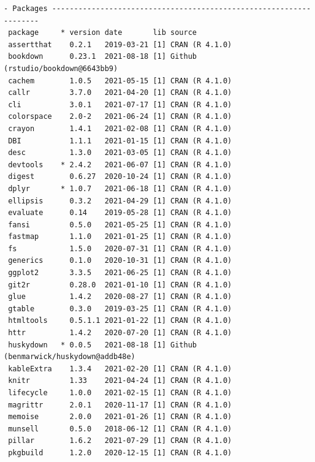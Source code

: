 \documentclass [11pt, proquest] {uwthesis}[2015/03/03]
\begin{document}
\begin{verbatim}
- Packages -------------------------------------------------------------------
 package     * version date       lib source                               
 assertthat    0.2.1   2019-03-21 [1] CRAN (R 4.1.0)                       
 bookdown      0.23.1  2021-08-18 [1] Github (rstudio/bookdown@6643bb9)    
 cachem        1.0.5   2021-05-15 [1] CRAN (R 4.1.0)                       
 callr         3.7.0   2021-04-20 [1] CRAN (R 4.1.0)                       
 cli           3.0.1   2021-07-17 [1] CRAN (R 4.1.0)                       
 colorspace    2.0-2   2021-06-24 [1] CRAN (R 4.1.0)                       
 crayon        1.4.1   2021-02-08 [1] CRAN (R 4.1.0)                       
 DBI           1.1.1   2021-01-15 [1] CRAN (R 4.1.0)                       
 desc          1.3.0   2021-03-05 [1] CRAN (R 4.1.0)                       
 devtools    * 2.4.2   2021-06-07 [1] CRAN (R 4.1.0)                       
 digest        0.6.27  2020-10-24 [1] CRAN (R 4.1.0)                       
 dplyr       * 1.0.7   2021-06-18 [1] CRAN (R 4.1.0)                       
 ellipsis      0.3.2   2021-04-29 [1] CRAN (R 4.1.0)                       
 evaluate      0.14    2019-05-28 [1] CRAN (R 4.1.0)                       
 fansi         0.5.0   2021-05-25 [1] CRAN (R 4.1.0)                       
 fastmap       1.1.0   2021-01-25 [1] CRAN (R 4.1.0)                       
 fs            1.5.0   2020-07-31 [1] CRAN (R 4.1.0)                       
 generics      0.1.0   2020-10-31 [1] CRAN (R 4.1.0)                       
 ggplot2       3.3.5   2021-06-25 [1] CRAN (R 4.1.0)                       
 git2r         0.28.0  2021-01-10 [1] CRAN (R 4.1.0)                       
 glue          1.4.2   2020-08-27 [1] CRAN (R 4.1.0)                       
 gtable        0.3.0   2019-03-25 [1] CRAN (R 4.1.0)                       
 htmltools     0.5.1.1 2021-01-22 [1] CRAN (R 4.1.0)                       
 httr          1.4.2   2020-07-20 [1] CRAN (R 4.1.0)                       
 huskydown   * 0.0.5   2021-08-18 [1] Github (benmarwick/huskydown@addb48e)
 kableExtra    1.3.4   2021-02-20 [1] CRAN (R 4.1.0)                       
 knitr         1.33    2021-04-24 [1] CRAN (R 4.1.0)                       
 lifecycle     1.0.0   2021-02-15 [1] CRAN (R 4.1.0)                       
 magrittr      2.0.1   2020-11-17 [1] CRAN (R 4.1.0)                       
 memoise       2.0.0   2021-01-26 [1] CRAN (R 4.1.0)                       
 munsell       0.5.0   2018-06-12 [1] CRAN (R 4.1.0)                       
 pillar        1.6.2   2021-07-29 [1] CRAN (R 4.1.0)                       
 pkgbuild      1.2.0   2020-12-15 [1] CRAN (R 4.1.0)                       

\end{verbatim}
\end{document}

